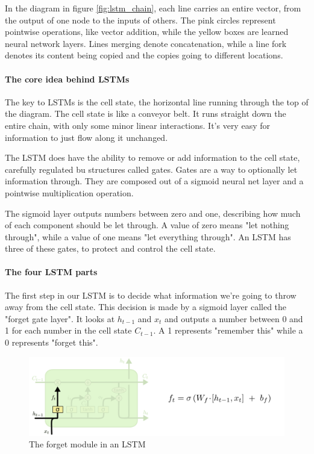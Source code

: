 \documentclass{article}
\begin{document}
In the diagram in figure \ref{fig:lstm_chain}, each line carries an entire vector, from the output of one node to the inputs of others.
The pink circles represent pointwise operations, like vector addition, while the yellow boxes are learned neural network layers.
Lines merging denote concatenation, while a line fork denotes its content being copied and the copies going to different locations.

\paragraph{The core idea behind LSTMs}

The key to LSTMs is the cell state, the horizontal line running through the top of the diagram.
The cell state is like a conveyor belt. It runs straight down the entire chain, with only some minor linear interactions.
It's very easy for information to just flow along it unchanged.

The LSTM does have the ability to remove or add information to the cell state, carefully regulated bu structures called gates.
Gates are a way to optionally let information through.
They are composed out of a sigmoid neural net layer and a pointwise multiplication operation.

The sigmoid layer outputs numbers between zero and one, describing how much of each component should be let through. A value of zero means "let nothing through", while a value of one means "let everything through".
An LSTM has three of these gates, to protect and control the cell state.

\paragraph{The four LSTM parts}
The first step in our LSTM is to decide what information we're going to throw away from the cell state.
This decision is made by a sigmoid layer called the "forget gate layer".
It looks at $h_{t-1}$ and $x_t$ and outputs a number between 0 and 1 for each number in the cell state $C_{t-1}$.
A 1 represents "remember this" while a 0 represents "forget this".

\begin{figure}[htbp]
  \centering
  \includegraphics[width=0.6\linewidth]{img/lstm_forget.png}
  \caption{The forget module in an LSTM}
  \label{fig:lstm_forget}
\end{figure}
\end{document}
